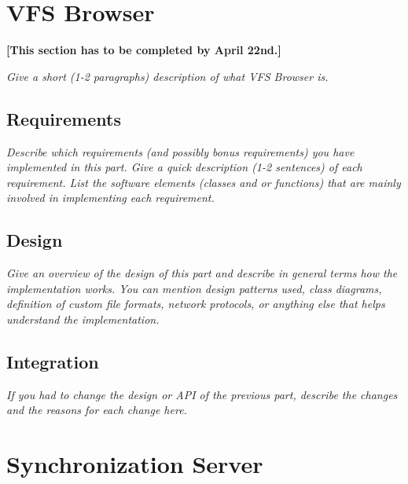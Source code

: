 \documentclass[a4paper,12pt]{article}
\begin{document}

\section{VFS Browser}

\textbf{[This section has to be completed by April 22nd.]}

\emph{Give a short (1-2 paragraphs) description of what VFS Browser is.}


\subsection{Requirements}

\emph{Describe which requirements (and possibly bonus requirements) you have implemented in this part. Give a quick description (1-2 sentences) of each requirement. List the software elements (classes and or functions) that are mainly involved in implementing each requirement.}


\subsection{Design}

\emph{Give an overview of the design of this part and describe in general terms how the implementation works. You can mention design patterns used, class diagrams, definition of custom file formats, network protocols, or anything else that helps understand the implementation.}


\subsection{Integration}

\emph{If you had to change the design or API of the previous part, describe the changes and the reasons for each change here.}




\section{Synchronization Server}
\end{document}
